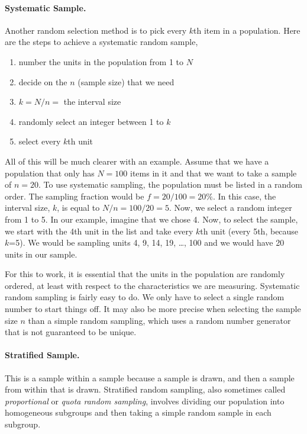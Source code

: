 \paragraph{Systematic Sample.} 
Another random selection method is to pick every $k$th item in a population.
Here are the steps to achieve a systematic random sample,
\begin{enumerate}
\item number the units in the population from 1 to $N$
\item decide on the $n$ (sample size) that we need
\item $k = N/n = $ the interval size
\item randomly select an integer between 1 to $k$
\item select every $k$th unit
\end{enumerate}

All of this will be much clearer with an example. Assume that we have a population that only has $N=100$ items in it and that we want to take a sample of $n=20$. To use systematic sampling, the population must be listed in a random order. The sampling fraction would be $f = 20/100 = 20\%$. In this case, the interval size, $k$, is equal to $N/n = 100/20 = 5$. Now, we select a random integer from 1 to 5. In our example, imagine that we chose 4. Now, to select the sample, we start with the 4th unit in the list and take every $k$th unit (every 5th, because $k$=5). We would be sampling units 4, 9, 14, 19, \ldots, 100 and we would have 20 units in our sample.

For this to work, it is essential that the units in the population are randomly ordered, at least with respect to the characteristics we are measuring. Systematic random sampling is fairly easy to do. We only have to select a single random number to start things off. It may also be more precise when selecting the sample size $n$ than a simple random sampling, which uses a random number generator that is not guaranteed to be unique.

\paragraph{Stratified Sample.} 
This is a sample within a sample because a sample is drawn, and then a sample from within that is drawn. Stratified random sampling, also sometimes called \emph{proportional} or \emph{quota random sampling}, involves dividing our population into homogeneous subgroups and then taking a simple random sample in each subgroup.

